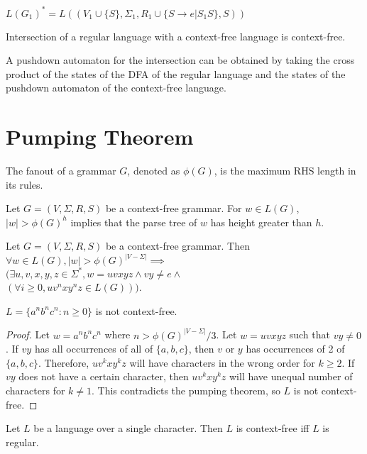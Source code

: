 $L(G_1)^* = L((V_1 \cup \{S\}, \Sigma_1,
R_1 \cup \{S \rightarrow e | S_1S \}, S))$

\begin{theorem}
Intersection of a regular language with a context-free language is context-free.
\end{theorem}
A pushdown automaton for the intersection can be obtained by taking the
cross product of the states of the DFA of the regular language
and the states of the pushdown automaton of the context-free language.

\section{Pumping Theorem}

\begin{definition}
The fanout of a grammar $G$, denoted as $\phi(G)$, is the maximum RHS length in its rules.
\end{definition}
\begin{lemma}
Let $G = (V, \Sigma, R, S)$ be a context-free grammar.
For $w \in L(G)$, $|w| > \phi(G)^h$ implies that the parse tree of $w$ has height greater than $h$.
\end{lemma}
\begin{theorem}
Let $G = (V, \Sigma, R, S)$ be a context-free grammar.
Then $\forall w \in L(G), |w| > \phi(G)^{|V - \Sigma|} \implies$\\
$(\exists u, v, x, y, z \in \Sigma^*, w = uvxyz \wedge vy \neq e \wedge$\\
$(\forall i \ge 0, uv^nxy^nz \in L(G)))$.
\end{theorem}

\begin{corollary}
$L = \{a^nb^nc^n: n \ge 0\}$ is not context-free.
\end{corollary}
\begin{proof}
Let $w = a^nb^nc^n$ where $n > \phi(G)^{|V-\Sigma|}/3$.
Let $w = uvxyz$ such that $vy \neq 0$.
If $vy$ has all occurrences of all of $\{a, b, c\}$,
then $v$ or $y$ has occurrences of 2 of $\{a, b, c\}$.
Therefore, $uv^kxy^kz$ will have characters in the wrong order for $k \ge 2$.
If $vy$ does not have a certain character,
then $uv^kxy^kz$ will have unequal number of characters for $k \neq 1$.
This contradicts the pumping theorem, so $L$ is not context-free.
\end{proof}

\begin{theorem}
Let $L$ be a language over a single character.
Then $L$ is context-free iff $L$ is regular.
\end{theorem}


